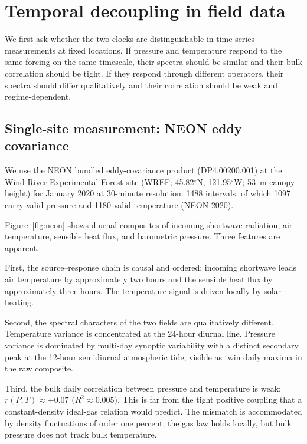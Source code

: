 \documentclass[11pt]{article}
\begin{document}
\section{Temporal decoupling in field data}
\label{sec:temporal}

We first ask whether the two clocks are distinguishable in time-series
measurements at fixed locations. If pressure and temperature respond to the same
forcing on the same timescale, their spectra should be similar and their bulk
correlation should be tight. If they respond through different operators, their
spectra should differ qualitatively and their correlation should be weak and
regime-dependent.

\subsection{Single-site measurement: NEON eddy covariance}
\label{sec:neon}

We use the NEON bundled eddy-covariance product (DP4.00200.001) at the Wind River
Experimental Forest site (WREF; 45.82$^\circ$N, 121.95$^\circ$W; 53~m canopy
height) for January 2020 at 30-minute resolution: 1488 intervals, of which 1097
carry valid pressure and 1180 valid temperature (NEON 2020).

Figure~\ref{fig:neon} shows diurnal composites of incoming shortwave radiation,
air temperature, sensible heat flux, and barometric pressure. Three features are
apparent.

First, the source--response chain is causal and ordered: incoming shortwave leads
air temperature by approximately two hours and the sensible heat flux by
approximately three hours. The temperature signal is driven locally by solar
heating.

Second, the spectral characters of the two fields are qualitatively different.
Temperature variance is concentrated at the 24-hour diurnal line. Pressure
variance is dominated by multi-day synoptic variability with a distinct secondary
peak at the 12-hour semidiurnal atmospheric tide, visible as twin daily maxima in
the raw composite.

Third, the bulk daily correlation between pressure and temperature is weak:
$r(P,T) \approx +0.07$ ($R^2 \approx 0.005$). This is far from the tight positive
coupling that a constant-density ideal-gas relation would predict. The mismatch is
accommodated by density fluctuations of order one percent; the gas law holds
locally, but bulk pressure does not track bulk temperature.
\end{document}
